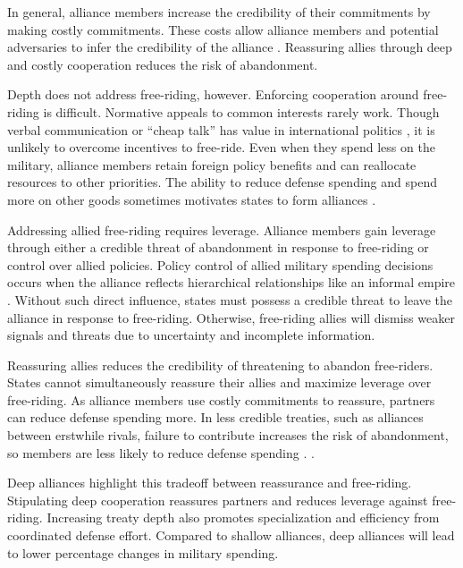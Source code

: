 \documentclass[12pt]{article}
\begin{document}
In general, alliance members increase the credibility of their commitments by making costly commitments. 
These costs allow alliance members and potential adversaries to infer the credibility of the alliance \citep{Leeds2003, FuhrmannSechser2014}. 
Reassuring allies through deep and costly cooperation reduces the risk of abandonment.


Depth does not address free-riding, however. 
Enforcing cooperation around free-riding is difficult.
Normative appeals to common interests rarely work. 
Though verbal communication or ``cheap talk'' has value in international politics \citep{Trager2010}, it is unlikely to overcome incentives to free-ride. 
Even when they spend less on the military, alliance members retain foreign policy benefits and can reallocate resources to other priorities. 
The ability to reduce defense spending and spend more on other goods sometimes motivates states to form alliances \citep{Kimball2010, AllenDigiuseppe2013}. 


Addressing allied free-riding requires leverage. 
Alliance members gain leverage through either a credible threat of abandonment in response to free-riding or control over allied policies. 
Policy control of allied military spending decisions occurs when the alliance reflects hierarchical relationships like an informal empire \citep{Lake1996}. 
Without such direct influence, states must possess a credible threat to leave the alliance in response to free-riding. 
Otherwise, free-riding allies will dismiss weaker signals and threats due to uncertainty and incomplete information. 


Reassuring allies reduces the credibility of threatening to abandon free-riders. 
States cannot simultaneously reassure their allies and maximize leverage over free-riding. 
As alliance members use costly commitments to reassure, partners can reduce defense spending more. 
In less credible treaties, such as alliances between erstwhile rivals, failure to contribute increases the risk of abandonment, so members are less likely to reduce defense spending \citep{NiouZeigler2019}. 
. 


Deep alliances highlight this tradeoff between reassurance and free-riding. 
Stipulating deep cooperation reassures partners and reduces leverage against free-riding. 
Increasing treaty depth also promotes specialization and efficiency from coordinated defense effort.
Compared to shallow alliances, deep alliances will lead to lower percentage changes in military spending. 
\end{document}
